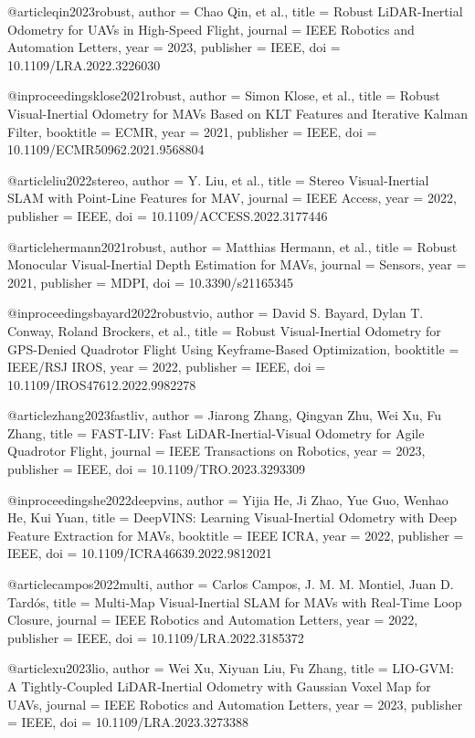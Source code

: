 @article{qin2023robust,
  author = {Chao Qin, et al.},
  title = {Robust LiDAR-Inertial Odometry for UAVs in High-Speed Flight},
  journal = {IEEE Robotics and Automation Letters},
  year = {2023},
  publisher = {IEEE},
  doi = {10.1109/LRA.2022.3226030}
}

@inproceedings{klose2021robust,
  author = {Simon Klose, et al.},
  title = {Robust Visual-Inertial Odometry for MAVs Based on KLT Features and Iterative Kalman Filter},
  booktitle = {ECMR},
  year = {2021},
  publisher = {IEEE},
  doi = {10.1109/ECMR50962.2021.9568804}
}

@article{liu2022stereo,
  author = {Y. Liu, et al.},
  title = {Stereo Visual-Inertial SLAM with Point-Line Features for MAV},
  journal = {IEEE Access},
  year = {2022},
  publisher = {IEEE},
  doi = {10.1109/ACCESS.2022.3177446}
}

@article{hermann2021robust,
  author = {Matthias Hermann, et al.},
  title = {Robust Monocular Visual-Inertial Depth Estimation for MAVs},
  journal = {Sensors},
  year = {2021},
  publisher = {MDPI},
  doi = {10.3390/s21165345}
}

@inproceedings{bayard2022robustvio,
  author = {David S. Bayard, Dylan T. Conway, Roland Brockers, et al.},
  title = {Robust Visual-Inertial Odometry for GPS-Denied Quadrotor Flight Using Keyframe-Based Optimization},
  booktitle = {IEEE/RSJ IROS},
  year = {2022},
  publisher = {IEEE},
  doi = {10.1109/IROS47612.2022.9982278}
}

@article{zhang2023fastliv,
  author = {Jiarong Zhang, Qingyan Zhu, Wei Xu, Fu Zhang},
  title = {FAST-LIV: Fast LiDAR‑Inertial‑Visual Odometry for Agile Quadrotor Flight},
  journal = {IEEE Transactions on Robotics},
  year = {2023},
  publisher = {IEEE},
  doi = {10.1109/TRO.2023.3293309}
}

@inproceedings{he2022deepvins,
  author = {Yijia He, Ji Zhao, Yue Guo, Wenhao He, Kui Yuan},
  title = {DeepVINS: Learning Visual-Inertial Odometry with Deep Feature Extraction for MAVs},
  booktitle = {IEEE ICRA},
  year = {2022},
  publisher = {IEEE},
  doi = {10.1109/ICRA46639.2022.9812021}
}

@article{campos2022multi,
  author = {Carlos Campos, J. M. M. Montiel, Juan D. Tardós},
  title = {Multi‑Map Visual‑Inertial SLAM for MAVs with Real‑Time Loop Closure},
  journal = {IEEE Robotics and Automation Letters},
  year = {2022},
  publisher = {IEEE},
  doi = {10.1109/LRA.2022.3185372}
}

@article{xu2023lio,
  author = {Wei Xu, Xiyuan Liu, Fu Zhang},
  title = {LIO‑GVM: A Tightly‑Coupled LiDAR‑Inertial Odometry with Gaussian Voxel Map for UAVs},
  journal = {IEEE Robotics and Automation Letters},
  year = {2023},
  publisher = {IEEE},
  doi = {10.1109/LRA.2023.3273388}
}

